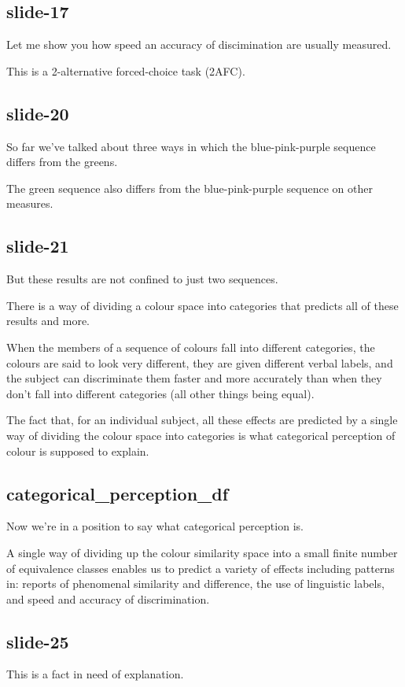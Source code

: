 \documentclass[12pt,\papersize]{extarticle}
\begin{document}
\subsection{slide-17}
Let me show you how speed an accuracy of discimination are usually measured.
 
This is a 2-alternative forced-choice task (2AFC).
 
\subsection{slide-20}
So far we've talked about three ways in which the blue-pink-purple sequence differs from the greens.
 
The green sequence also differs from the blue-pink-purple sequence on other measures.
 
\subsection{slide-21}
But these results are not confined to just two sequences.
 
There is a way of dividing a colour space into categories that predicts all of these results and more.
 
When the members of a sequence of colours fall into different categories, the colours are said to look very different, they are given different verbal labels, and the subject can discriminate them faster and more accurately than when they don't fall into different categories (all other things being equal).
 
The fact that, for an individual subject, all these effects are predicted by a single way of dividing the colour space into categories is what categorical perception of colour is supposed to explain.
 
\subsection{categorical\_perception\_df}
Now we're in a position to say what categorical perception is.
 
A single way of dividing up the colour similarity space into a small finite number of equivalence classes enables us to predict a variety of effects including patterns in: reports of phenomenal similarity and difference, the use of linguistic labels, and speed and accuracy of discrimination. 
 
\subsection{slide-25}
This is a fact in need of explanation.
 
\end{document}

